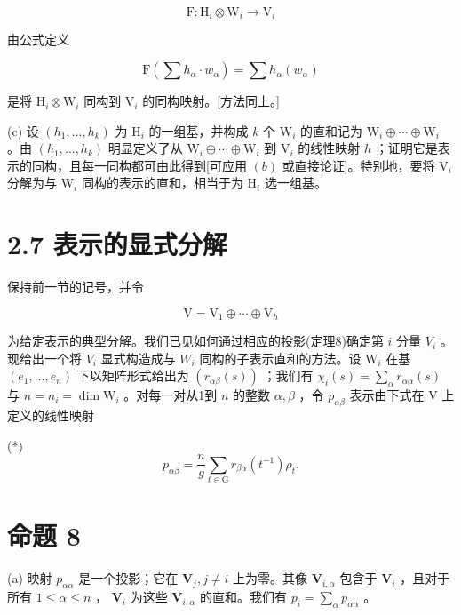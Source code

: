 \documentclass[10pt]{article}
\begin{document}
\[
\mathrm{F} : {\mathrm{H}}_{i} \otimes  {\mathrm{W}}_{i} \rightarrow  {\mathrm{V}}_{i}
\]

由公式定义

\[
\mathrm{F}\left( {\sum {h}_{\alpha } \cdot  {w}_{\alpha }}\right)  = \sum {h}_{\alpha }\left( {w}_{\alpha }\right)
\]

是将 \({\mathrm{H}}_{i} \otimes  {\mathrm{W}}_{i}\) 同构到 \({\mathrm{V}}_{i}\) 的同构映射。[方法同上。]

(c) 设 \(\left( {{h}_{1},\ldots ,{h}_{k}}\right)\) 为 \({\mathrm{H}}_{i}\) 的一组基，并构成 \(k\) 个 \({\mathrm{W}}_{i}\) 的直和记为 \({\mathrm{W}}_{i} \oplus  \cdots  \oplus  {\mathrm{W}}_{i}\) 。由 \(\left( {{h}_{1},\ldots ,{h}_{k}}\right)\) 明显定义了从 \({\mathrm{W}}_{i} \oplus  \cdots  \oplus  {\mathrm{W}}_{i}\) 到 \({\mathrm{V}}_{i}\) 的线性映射 \(h\) ；证明它是表示的同构，且每一同构都可由此得到[可应用 \(\left( b\right)\) 或直接论证]。特别地，要将 \({\mathrm{V}}_{i}\) 分解为与 \({\mathrm{W}}_{i}\) 同构的表示的直和，相当于为 \({\mathrm{H}}_{i}\) 选一组基。

\section*{2.7 表示的显式分解}

保持前一节的记号，并令

\[
\mathrm{V} = {\mathrm{V}}_{1} \oplus  \cdots  \oplus  {\mathrm{V}}_{h}
\]

为给定表示的典型分解。我们已见如何通过相应的投影(定理8)确定第 \(i\) 分量 \({V}_{i}\) 。现给出一个将 \({V}_{i}\) 显式构造成与 \({W}_{i}\) 同构的子表示直和的方法。设 \({\mathrm{W}}_{i}\) 在基 \(\left( {{e}_{1},\ldots ,{e}_{n}}\right)\) 下以矩阵形式给出为 \(\left( {{r}_{\alpha \beta }\left( s\right) }\right)\) ；我们有 \({\chi }_{i}\left( s\right)  = \mathop{\sum }\limits_{\alpha }{r}_{\alpha \alpha }\left( s\right)\) 与 \(n = {n}_{i} = \dim {\mathrm{W}}_{i}\) 。对每一对从1到 \(n\) 的整数 \(\alpha ,\beta\) ，令 \({p}_{\alpha \beta }\) 表示由下式在 \(\mathrm{V}\) 上定义的线性映射

(*)
\[
{p}_{\alpha \beta } = \frac{n}{g}\mathop{\sum }\limits_{{t \in  \mathrm{G}}}{r}_{\beta \alpha }\left( {t}^{-1}\right) {\rho }_{t}.
\]

\section*{命题 8}

(a) 映射 \({p}_{\alpha \alpha }\) 是一个投影；它在 \({\mathbf{V}}_{j},j \neq  i\) 上为零。其像 \({\mathbf{V}}_{i,\alpha }\) 包含于 \({\mathbf{V}}_{i}\) ，且对于所有 \(1 \leq  \alpha  \leq  n\) ， \({\mathbf{V}}_{i}\) 为这些 \({\mathbf{V}}_{i,\alpha }\) 的直和。我们有 \({p}_{i} = \mathop{\sum }\limits_{\alpha }{p}_{\alpha \alpha }\) 。
\end{document}
